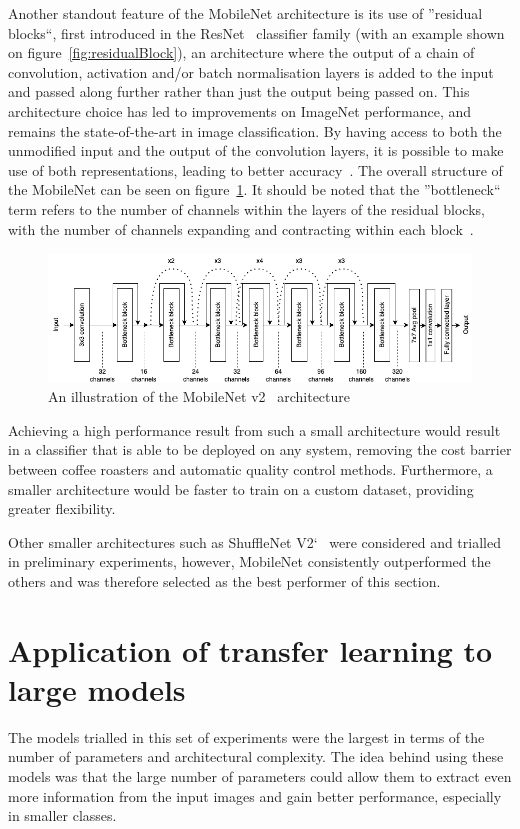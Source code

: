 Another standout feature of the MobileNet architecture is its use of ''residual blocks``, first introduced in the ResNet~\cite{resNet} classifier family (with an example shown on figure~\ref{fig:residualBlock}), an architecture where the output of
a chain of convolution, activation and/or batch normalisation layers is added to the input and passed along further rather than just the output being passed on.
This architecture choice has led to improvements on ImageNet performance, and remains the state-of-the-art in image classification.
By having access to both the unmodified input and the output of the convolution layers, it is possible to make use of both representations,
leading to better accuracy~\cite{resNet}.
The overall structure of the MobileNet can be seen on figure~\ref{fig:mobilenetSketch}.
It should be noted that the ''bottleneck`` term refers to the number of channels within the layers of the residual blocks,
with the number of channels expanding and contracting within each block~\cite{mobileNet}.

\begin{figure}[!ht]
    \centering
    \includegraphics[width=\textwidth]{figures/methodology/mobilenet_diagram}
    \caption[An illustration of the MobileNet v2 architecture]
    {An illustration of the MobileNet v2~\cite{mobileNet} architecture}
    \label{fig:mobilenetSketch}
\end{figure}

Achieving a high performance result from such a small architecture would result in a classifier that is able to be deployed
on any system, removing the cost barrier between coffee roasters and automatic quality control methods.
Furthermore, a smaller architecture would be faster to train on a custom dataset, providing greater flexibility.

Other smaller architectures such as ShuffleNet V2`~\cite{shuffleNet} were considered and trialled in preliminary experiments,
however, MobileNet consistently outperformed the others and was therefore selected as the best performer of this section.


\section{Application of transfer learning to large models}
\label{sec:transfer-learning}
The models trialled in this set of experiments were the largest in terms of the number of parameters and
architectural complexity.
The idea behind using these models was that the large number of parameters could allow them to extract even more information
from the input images and gain better performance, especially in smaller classes.

